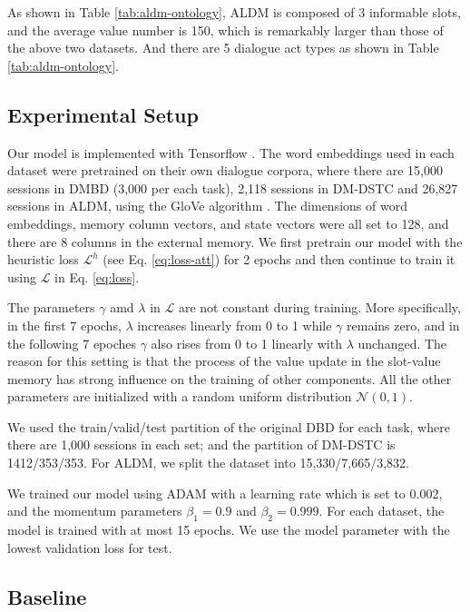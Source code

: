 As shown in Table \ref{tab:aldm-ontology}, ALDM is composed of 3 informable slots, and the average value number is 150, which is remarkably larger than those of the above two datasets. And there are 5 dialogue act types as shown in Table \ref{tab:aldm-ontology}.


\subsection{Experimental Setup}
Our model is implemented with Tensorflow \cite{abadi2016tensorflow}. The word embeddings used in each dataset were pretrained on their own dialogue corpora, where there are 15,000 sessions in DMBD (3,000 per each task), 2,118 sessions in DM-DSTC and 26,827 sessions in ALDM, using the GloVe algorithm \cite{pennington2014glove}. The dimensions of word embeddings, memory column vectors, and state vectors were all set to 128, and there are 8 columns in the external memory. 
We first pretrain our model with the heuristic loss $\mathcal{L}^h$ (see Eq. \ref{eq:loss-att}) for 2 epochs and then continue to train it using $\mathcal{L}$ in Eq. \ref{eq:loss}.

The parameters $\gamma$ amd $\lambda$ in $\mathcal{L}$ are not constant during training.
More specifically, in the first 7 epochs, $\lambda$ increases linearly from 0 to 1 while $\gamma$ remains zero, and in the following 7 epoches $\gamma$ also rises from 0 to 1 linearly with $\lambda$ unchanged. The reason for this setting is that the process of the value update in the slot-value memory has strong influence on the training of other components.
All the other parameters are initialized with a random uniform distribution $\mathcal{N}(0, 1)$.

We used the train/valid/test partition of the original DBD for each task, where there are 1,000 sessions in each set; and the partition of DM-DSTC is 1412/353/353. For ALDM, we split the dataset into 15,330/7,665/3,832.

We trained our model using ADAM \cite{kingma2014adam} with a learning rate which is set to 0.002, and the momentum parameters ${\beta}_1 = 0.9$ and ${\beta}_2 = 0.999$. For each dataset, the model is trained with at most 15 epochs. We use the model parameter with the lowest validation loss for test.


\subsection{Baseline}

